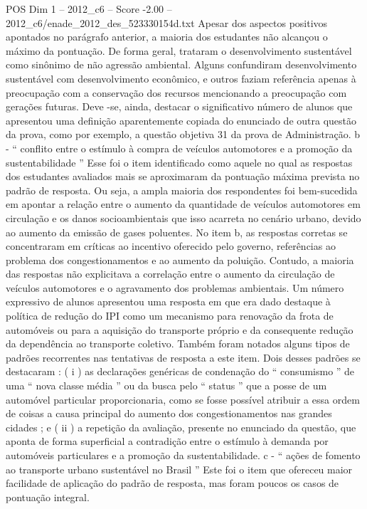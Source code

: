 \begin{textsample}{POS Dim 1 – 2012\_c6 – Score -2.00 – 2012\_c6/enade\_2012\_des\_523330154d.txt}
Apesar dos aspectos positivos apontados no parágrafo anterior, a maioria dos estudantes não alcançou o máximo da pontuação.
De forma geral, trataram o desenvolvimento sustentável como sinônimo de não agressão ambiental.
Alguns confundiram desenvolvimento sustentável com desenvolvimento econômico, e outros faziam referência apenas à preocupação com a conservação dos recursos mencionando a preocupação com gerações futuras.
Deve -se, ainda, destacar o significativo número de alunos que apresentou uma definição aparentemente copiada do enunciado de outra questão da prova, como por exemplo, a questão objetiva 31 da prova de Administração. b - “ conflito entre o estímulo à compra de veículos automotores e a promoção da sustentabilidade ” Esse foi o item identificado como aquele no qual as respostas dos estudantes avaliados mais se aproximaram da pontuação máxima prevista no padrão de resposta.
Ou seja, a ampla maioria dos respondentes foi bem-sucedida em apontar a relação entre o aumento da quantidade de veículos automotores em circulação e os danos socioambientais que isso acarreta no cenário urbano, devido ao aumento da emissão de gases poluentes.
No item b, as respostas corretas se concentraram em críticas ao incentivo oferecido pelo governo, referências ao problema dos congestionamentos e ao aumento da poluição.
Contudo, a maioria das respostas não explicitava a correlação entre o aumento da circulação de veículos automotores e o agravamento dos problemas ambientais.
Um número expressivo de alunos apresentou uma resposta em que era dado destaque à política de redução do IPI como um mecanismo para renovação da frota de automóveis ou para a aquisição do transporte próprio e da consequente redução da dependência ao transporte coletivo.
Também foram notados alguns tipos de padrões recorrentes nas tentativas de resposta a este item.
Dois desses padrões se destacaram : ( i ) as declarações genéricas de condenação do “ consumismo ” de uma “ nova classe média ” ou da busca pelo “ status ” que a posse de um automóvel particular proporcionaria, como se fosse possível atribuir a essa ordem de coisas a causa principal do aumento dos congestionamentos nas grandes cidades ; e ( ii ) a repetição da avaliação, presente no enunciado da questão, que aponta de forma superficial a contradição entre o estímulo à demanda por automóveis particulares e a promoção da sustentabilidade. c - “ ações de fomento ao transporte urbano sustentável no Brasil ” Este foi o item que ofereceu maior facilidade de aplicação do padrão de resposta, mas foram poucos os casos de pontuação integral.

\end{textsample}
